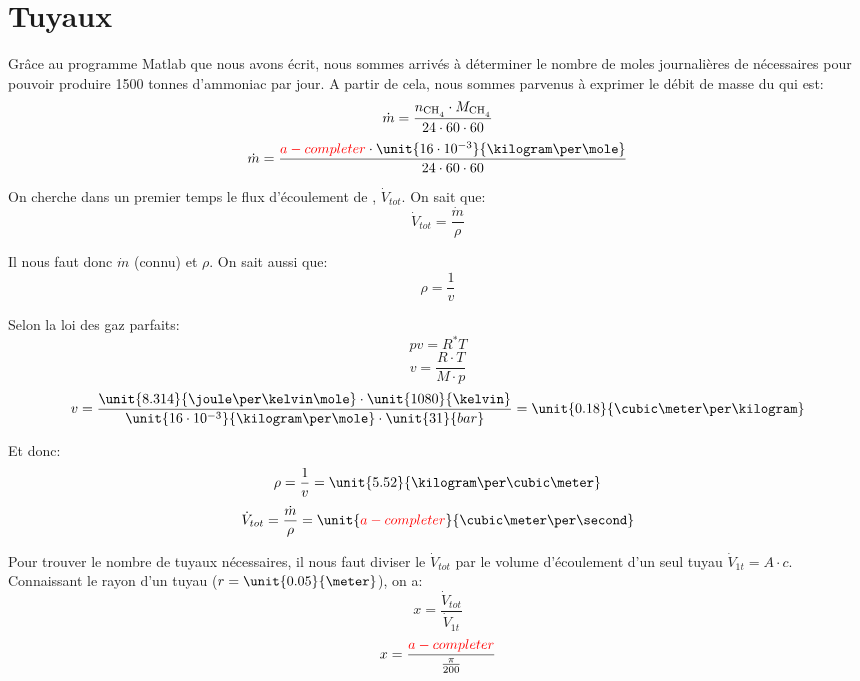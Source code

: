 \documentclass{article}
\begin{document}
\section*{Tuyaux}

Grâce au programme Matlab que nous avons écrit, nous sommes arrivés à déterminer le nombre de moles journalières de  nécessaires pour pouvoir produire 1500 tonnes d'ammoniac par jour. A partir de cela, nous sommes parvenus à exprimer le débit de masse du  qui est: 
	$$\dot{m}=\frac{n_{\ce{CH4}}\cdot M_{\ce{CH4}}}{24\cdot60\cdot60}$$
	$$\dot{m}=\frac{\textcolor{red}{a-completer}\cdot\unit{16\cdot10^{-3}}{\kilogram\per\mole}}{24\cdot60\cdot60}$$%

On cherche dans un premier temps le flux d'écoulement de , $\dot{V}_{tot}$. On sait que: 
	$$\dot{V}_{tot}=\frac{\dot{m}}{\rho}$$

Il nous faut donc $\dot{m}$ (connu) et $\rho$. On sait aussi que:
	$$\rho = \frac{1}{v}$$

Selon la loi des gaz parfaits:
	$$pv=R^{*}T$$
	$$v=\frac{R\cdot T}{M\cdot p}$$
	$$v=\frac{\unit{8.314}{\joule\per\kelvin\mole}\cdot\unit{1080}{\kelvin}}{\unit{16\cdot10^{-3}}{\kilogram\per\mole}\cdot\unit{31}{bar}}=\unit{0.18}{\cubic\meter\per\kilogram}$$

Et donc:
	$$\rho = \frac{1}{v} = \unit{5.52}{\kilogram\per\cubic\meter}$$
	$$\dot{V}_{tot} = \frac{\dot{m}}{\rho}=\unit{\textcolor{red}{a-completer}}{\cubic\meter\per\second}$$%

Pour trouver le nombre de tuyaux nécessaires, il nous faut diviser le $\dot{V}_{tot}$ par le volume d'écoulement d'un seul tuyau $\dot{V}_{1t} = A\cdot c$. Connaissant le rayon d'un tuyau ($r=\unit{0.05}{\meter}$), on a:
	$$x = \frac{\dot{V}_{tot}}{\dot{V}_{1t}}$$
	$$x = \frac{\textcolor{red}{a-completer}}{\frac{\pi}{200}}$$%
\end{document}
